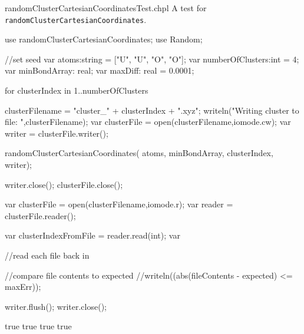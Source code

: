 \begin{chapelexample}{randomClusterCartesianCoordinatesTest.chpl}
  A test for \lstinline{randomClusterCartesianCoordinates}. 
  \begin{chapelpre}
  \end{chapelpre}
  \begin{chapel}
use randomClusterCartesianCoordinates;
use Random;
  
//set seed
var atoms:string = ["U", "U", "O", "O"];
var numberOfClusters:int = 4; 
var minBondArray: real; 
var maxDiff: real = 0.0001;

for clusterIndex in 1..numberOfClusters {
  clusterFilename = "cluster_" + clusterIndex + ".xyz";
  writeln("Writing cluster to file: ",clusterFilename);
  var clusterFile = open(clusterFilename,iomode.cw);
  var writer = clusterFile.writer();

  randomClusterCartesianCoordinates(
    atoms,
    minBondArray,
    clusterIndex,
    writer);

    writer.close();
    clusterFile.close();

  var clusterFile = open(clusterFilename,iomode.r);
  var reader = clusterFile.reader();

  var clusterIndexFromFile = reader.read(int);
  var 


    //read each file back in


    //compare file contents to expected
  //writeln((abs(fileContents - expected) <= maxErr));

  writer.flush(); 
  writer.close();
}
\end{chapel}
\begin{chapelpost}
\end{chapelpost}
\begin{chapeloutput}
true
true
true
true
\end{chapeloutput}
\end{chapelexample}

